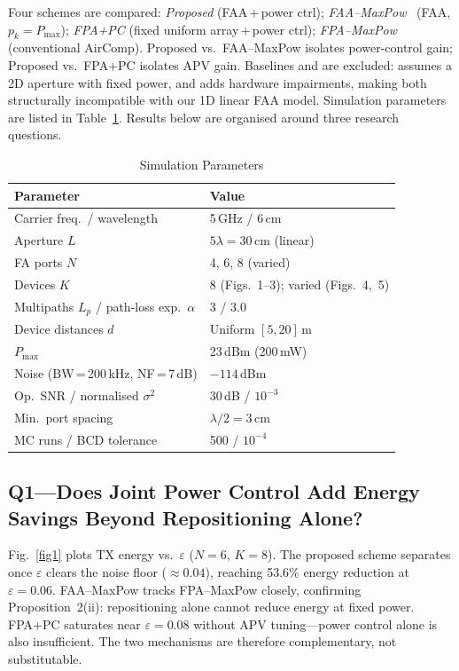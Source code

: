\documentclass[journal,letterpaper,10pt,twocolumn]{IEEEtran}
\begin{document}
Four schemes are compared: \textit{Proposed} (FAA\,+\,power ctrl);
\textit{FAA--MaxPow}~\cite{Zhang2024} (FAA, $p_{k}\!=\!P_{\max}$);
\textit{FPA+PC} (fixed uniform array\,+\,power ctrl);
\textit{FPA--MaxPow} (conventional AirComp). Proposed
vs.\ FAA--MaxPow isolates power-control gain; Proposed
vs.\ FPA+PC isolates APV gain. Baselines \cite{Li2025} and
\cite{LiHW2024} are excluded: \cite{Li2025} assumes a 2D aperture with
fixed power, and \cite{LiHW2024} adds hardware impairments, making both
structurally incompatible with our 1D linear FAA model.
Simulation parameters are listed in Table~\ref{tab:params}. Results
below are organised around three research questions.

\begin{table}[!t]
  \caption{Simulation Parameters}
  \label{tab:params}
  \centering
  \small
  \begin{tabular}{@{}ll@{}}
    \toprule
    Parameter & Value\\
    \midrule
    Carrier freq.\ / wavelength       & 5\,GHz / 6\,cm\\
    Aperture $L$                      & $5\lambda=30$\,cm (linear)\\
    FA ports $N$                      & 4, 6, 8 (varied)\\
    Devices $K$                       & 8 (Figs.~1--3); varied (Figs.~4,~5)\\
    Multipaths $L_{p}$ / path-loss exp.\ $\alpha$ & 3 / 3.0\\
    Device distances $d$              & Uniform $[5,20]$\,m\\
    $P_{\max}$                        & 23\,dBm (200\,mW)\\
    Noise (BW\,=\,200\,kHz, NF\,=\,7\,dB) & $-114$\,dBm\\
    Op.\ SNR / normalised $\sigma^{2}$ & 30\,dB / $10^{-3}$\\
    Min.\ port spacing                & $\lambda/2=3$\,cm\\
    MC runs / BCD tolerance           & 500 / $10^{-4}$\\
    \bottomrule
  \end{tabular}
\end{table}

\subsection{Q1---Does Joint Power Control Add Energy Savings Beyond Repositioning Alone?}

Fig.~\ref{fig1} plots TX energy vs.\ $\varepsilon$ ($N\!=\!6$,
$K\!=\!8$). The proposed scheme separates once $\varepsilon$ clears the
noise floor ($\approx\!0.04$), reaching 53.6\% energy reduction at
$\varepsilon\!=\!0.06$. FAA--MaxPow tracks FPA--MaxPow closely,
confirming Proposition~2(ii): repositioning alone cannot reduce energy
at fixed power. FPA+PC saturates near $\varepsilon\!=\!0.08$ without
APV tuning---power control alone is also insufficient. The two
mechanisms are therefore complementary, not substitutable.
\end{document}
